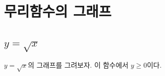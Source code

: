 \documentclass{article}
\newcounter{num}
\newcommand{\theo}[1]
{\bigskip\noindent\refstepcounter{num}\textbf{정리 \arabic{num}) #1}\par}
\begin{document}
%
%
%
%
%

\clearpage
\section{무리함수의 그래프}
\subsection{\(y=\sqrt{x}\)}
\(y=\sqrt x\)의 그래프를 그려보자.
이 함수에서 \(y\ge0\)이다.
\end{document}
